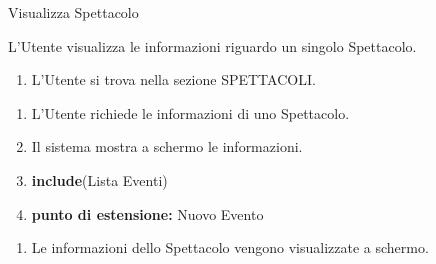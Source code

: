 {\ucTable	%
	{	%
		Visualizza Spettacolo
		
	}{	%
		
	}{	%
		L'Utente visualizza le informazioni riguardo un singolo Spettacolo.
		
	}{	%
		\attori
	}{	%
		\begin{enumerate}
			\item L'Utente si trova nella sezione SPETTACOLI.
		\end{enumerate}
		
	}{	%
		\begin{enumerate}
			\item L'Utente richiede le informazioni di uno Spettacolo.
            \item Il sistema mostra a schermo le informazioni.
            \item \textbf{include}(Lista Eventi)
            \item[] \textbf{punto di estensione:} Nuovo Evento
		\end{enumerate}
		
	}{	%
		\begin{enumerate}
			\item Le informazioni dello Spettacolo vengono visualizzate a schermo.
		\end{enumerate}
		
	}{	%
} }


